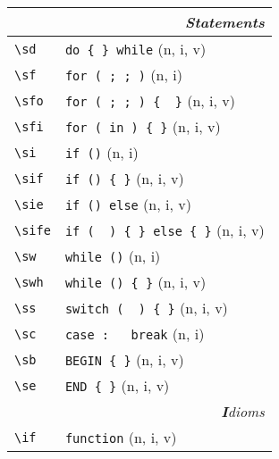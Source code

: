 \documentclass[oneside,10pt,landscape,DIV17]{scrartcl}
\begin{document}
\begin{multicols}{3}
\begin{center}
%
%
\begin{tabular}[]{|p{11mm}|p{60mm}|}
\hline
\multicolumn{2}{|r|}{\textsl{\textbf{S}tatements}}                    \\[1.0ex]
\hline \verb'\sd'      & \verb'do { } while'          \hfill (n, i, v)\\
\hline \verb'\sf'      & \verb'for ( ; ; )'           \hfill (n, i)\\
\hline \verb'\sfo'     & \verb'for ( ; ; ) {  }'      \hfill (n, i, v)\\
\hline \verb'\sfi'     & \verb'for ( in ) { }'        \hfill (n, i, v)\\
\hline \verb'\si'      & \verb'if ()'                 \hfill (n, i)\\
\hline \verb'\sif'     & \verb'if () { }'             \hfill (n, i, v)\\
\hline \verb'\sie'     & \verb'if () else'            \hfill (n, i, v)\\
\hline \verb'\sife'    & \verb'if (  ) { } else { }'  \hfill (n, i, v)\\
\hline \verb'\sw'      & \verb'while ()'              \hfill (n, i)\\
\hline \verb'\swh'     & \verb'while () { }'          \hfill (n, i, v)\\
\hline \verb'\ss'      & \verb'switch (  ) { }'       \hfill (n, i, v)\\
\hline \verb'\sc'      & \verb'case :	break'          \hfill (n, i)\\
\hline \verb'\sb'      & \verb'BEGIN { }'             \hfill (n, i, v)\\
\hline \verb'\se'      & \verb'END { }'               \hfill (n, i, v)\\
\hline
\hline
\multicolumn{2}{|r|}{\textsl{\textbf{I}dioms}}                 \\[1.0ex]
\hline \verb'\if' & \verb'function'            \hfill (n, i, v)\\
\hline
\hline

\end{tabular}
\end{center}
\end{multicols}
\end{document}
